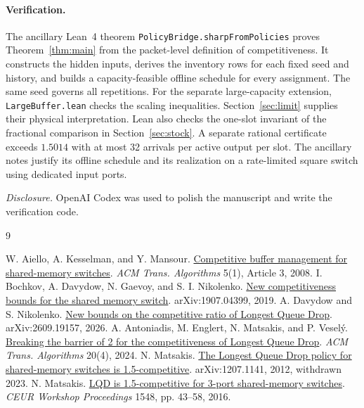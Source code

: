 \documentclass[11pt,letterpaper]{article}
\begin{document}
\paragraph{Verification.}
The ancillary Lean~4 theorem \texttt{PolicyBridge.sharpFromPolicies} proves Theorem~\ref{thm:main} from the packet-level definition of competitiveness. It constructs the hidden inputs, derives the inventory rows for each fixed seed and history, and builds a capacity-feasible offline schedule for every assignment. The same seed governs all repetitions. For the separate large-capacity extension, \texttt{LargeBuffer.lean} checks the scaling inequalities. Section~\ref{sec:limit} supplies their physical interpretation. Lean also checks the one-slot invariant of the fractional comparison in Section~\ref{sec:stock}. A separate rational certificate exceeds $1.5014$ with at most 32 arrivals per active output per slot. The ancillary notes justify its offline schedule and its realization on a rate-limited square switch using dedicated input ports.

\smallskip
\noindent\textit{Disclosure.} OpenAI Codex was used to polish the manuscript and write the verification code.

\begin{thebibliography}{9}\small\raggedright\setlength{\itemsep}{1.5pt}
 W. Aiello, A. Kesselman, and Y. Mansour. \href{https://doi.org/10.1145/1435375.1435378}{Competitive buffer management for shared-memory switches}. \emph{ACM Trans. Algorithms} 5(1), Article 3, 2008.
 I. Bochkov, A. Davydow, N. Gaevoy, and S. I. Nikolenko. \href{https://arxiv.org/abs/1907.04399}{New competitiveness bounds for the shared memory switch}. arXiv:1907.04399, 2019.
 A. Davydow and S. Nikolenko. \href{https://arxiv.org/abs/2609.19157}{New bounds on the competitive ratio of Longest Queue Drop}. arXiv:2609.19157, 2026.
 A. Antoniadis, M. Englert, N. Matsakis, and P. Vesel\'y. \href{https://doi.org/10.1145/3676887}{Breaking the barrier of 2 for the competitiveness of Longest Queue Drop}. \emph{ACM Trans. Algorithms} 20(4), 2024.
 N. Matsakis. \href{https://arxiv.org/abs/1207.1141}{The Longest Queue Drop policy for shared-memory switches is 1.5-competitive}. arXiv:1207.1141, 2012, withdrawn 2023.
 N. Matsakis. \href{https://ceur-ws.org/Vol-1548/043-Matsakis.pdf}{LQD is 1.5-competitive for 3-port shared-memory switches}. \emph{CEUR Workshop Proceedings} 1548, pp. 43--58, 2016.
\end{thebibliography}
\end{document}

